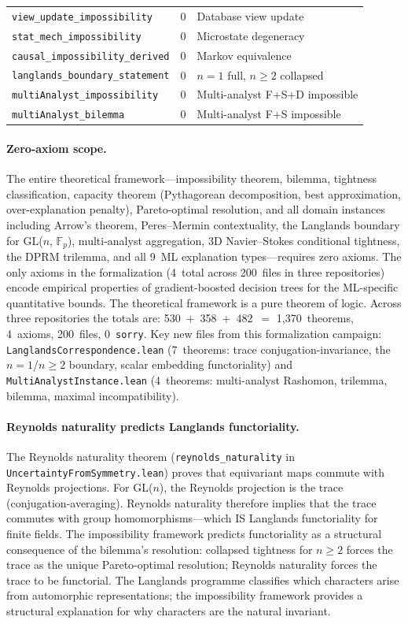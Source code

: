 \documentclass[11pt,a4paper]{article}
\begin{document}
\begin{table}[ht]
\begin{tabular}{@{}lrl@{}}
\texttt{view\_update\_impossibility} & 0 & Database view update \\
\texttt{stat\_mech\_impossibility} & 0 & Microstate degeneracy \\
\texttt{causal\_impossibility\_derived} & 0 & Markov equivalence \\
\texttt{langlands\_boundary\_statement} & 0 & $n{=}1$ full, $n{\geq}2$ collapsed \\
\texttt{multiAnalyst\_impossibility} & 0 & Multi-analyst F+S+D impossible \\
\texttt{multiAnalyst\_bilemma} & 0 & Multi-analyst F+S impossible \\
\bottomrule
\end{tabular}
\end{table}

\paragraph{Zero-axiom scope.}
The entire theoretical framework---impossibility theorem, bilemma, tightness classification, capacity theorem (Pythagorean decomposition, best approximation, over-explanation penalty), Pareto-optimal resolution, and all domain instances including Arrow's theorem, Peres--Mermin contextuality, the Langlands boundary for GL($n$, $\mathbb{F}_p$), multi-analyst aggregation, 3D Navier--Stokes conditional tightness, the DPRM trilemma, and all 9~ML explanation types---requires zero axioms.  The only axioms in the formalization (4~total across 200~files in three repositories) encode empirical properties of gradient-boosted decision trees for the ML-specific quantitative bounds.  The theoretical framework is a pure theorem of logic.  Across three repositories the totals are: 530~$+$~358~$+$~482~$=$ 1{,}370~theorems, 4~axioms, 200~files, 0~\texttt{sorry}.  Key new files from this formalization campaign: \texttt{LanglandsCorrespondence.lean} (7~theorems: trace conjugation-invariance, the $n{=}1$/$n{\geq}2$ boundary, scalar embedding functoriality) and \texttt{MultiAnalystInstance.lean} (4~theorems: multi-analyst Rashomon, trilemma, bilemma, maximal incompatibility).

\paragraph{Reynolds naturality predicts Langlands functoriality.}
The Reynolds naturality theorem (\texttt{reynolds\_naturality} in \texttt{UncertaintyFromSymmetry.lean}) proves that equivariant maps commute with Reynolds projections.  For GL($n$), the Reynolds projection is the trace (conjugation-averaging).  Reynolds naturality therefore implies that the trace commutes with group homomorphisms---which IS Langlands functoriality for finite fields.  The impossibility framework predicts functoriality as a structural consequence of the bilemma's resolution: collapsed tightness for $n \geq 2$ forces the trace as the unique Pareto-optimal resolution; Reynolds naturality forces the trace to be functorial.  The Langlands programme classifies which characters arise from automorphic representations; the impossibility framework provides a structural explanation for why characters are the natural invariant.
\end{document}

